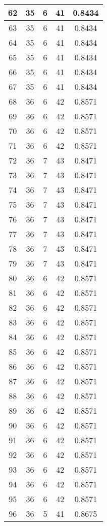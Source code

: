 \documentclass[letterpaper, 12pt]{article}
\begin{document}
\begin{longtable}{|c|c|c|c|c|}
\hline
62 & 35 & 6 & 41 & 0.8434 \\
\hline
63 & 35 & 6 & 41 & 0.8434 \\
\hline
64 & 35 & 6 & 41 & 0.8434 \\
\hline
65 & 35 & 6 & 41 & 0.8434 \\
\hline
66 & 35 & 6 & 41 & 0.8434 \\
\hline
67 & 35 & 6 & 41 & 0.8434 \\
\hline
68 & 36 & 6 & 42 & 0.8571 \\
\hline
69 & 36 & 6 & 42 & 0.8571 \\
\hline
70 & 36 & 6 & 42 & 0.8571 \\
\hline
71 & 36 & 6 & 42 & 0.8571 \\
\hline
72 & 36 & 7 & 43 & 0.8471 \\
\hline
73 & 36 & 7 & 43 & 0.8471 \\
\hline
74 & 36 & 7 & 43 & 0.8471 \\
\hline
75 & 36 & 7 & 43 & 0.8471 \\
\hline
76 & 36 & 7 & 43 & 0.8471 \\
\hline
77 & 36 & 7 & 43 & 0.8471 \\
\hline
78 & 36 & 7 & 43 & 0.8471 \\
\hline
79 & 36 & 7 & 43 & 0.8471 \\
\hline
80 & 36 & 6 & 42 & 0.8571 \\
\hline
81 & 36 & 6 & 42 & 0.8571 \\
\hline
82 & 36 & 6 & 42 & 0.8571 \\
\hline
83 & 36 & 6 & 42 & 0.8571 \\
\hline
84 & 36 & 6 & 42 & 0.8571 \\
\hline
85 & 36 & 6 & 42 & 0.8571 \\
\hline
86 & 36 & 6 & 42 & 0.8571 \\
\hline
87 & 36 & 6 & 42 & 0.8571 \\
\hline
88 & 36 & 6 & 42 & 0.8571 \\
\hline
89 & 36 & 6 & 42 & 0.8571 \\
\hline
90 & 36 & 6 & 42 & 0.8571 \\
\hline
91 & 36 & 6 & 42 & 0.8571 \\
\hline
92 & 36 & 6 & 42 & 0.8571 \\
\hline
93 & 36 & 6 & 42 & 0.8571 \\
\hline
94 & 36 & 6 & 42 & 0.8571 \\
\hline
95 & 36 & 6 & 42 & 0.8571 \\
\hline
96 & 36 & 5 & 41 & 0.8675 \\

\end{longtable}
\end{document}
